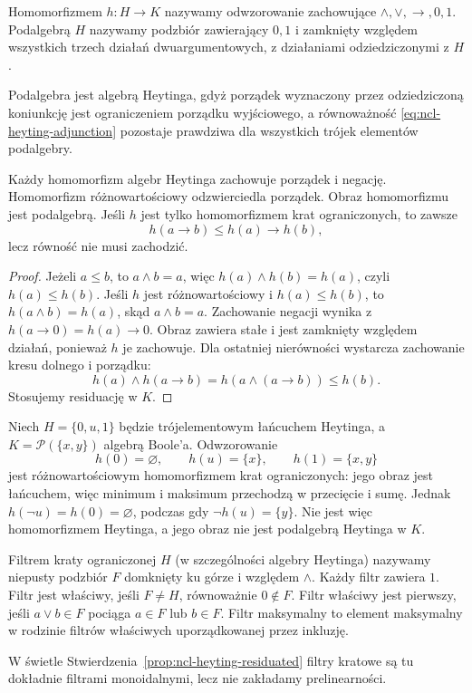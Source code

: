 \begin{definicja}
\label{def:ncl-heyting-homomorphism}
Homomorfizmem $h:H\to K$ nazywamy odwzorowanie
zachowujące $\wedge,\vee,\to,0,1$.
Podalgebrą $H$ nazywamy podzbiór zawierający $0,1$
i zamknięty względem wszystkich trzech działań
dwuargumentowych, z działaniami odziedziczonymi z $H$.
\end{definicja}
Podalgebra jest algebrą Heytinga, gdyż porządek
wyznaczony przez odziedziczoną koniunkcję jest
ograniczeniem porządku wyjściowego, a równoważność
\eqref{eq:ncl-heyting-adjunction} pozostaje prawdziwa
dla wszystkich trójek elementów podalgebry.

\begin{stwierdzenie}
\label{prop:ncl-heyting-hom-order}
Każdy homomorfizm algebr Heytinga zachowuje porządek
i negację. Homomorfizm różnowartościowy odzwierciedla
porządek. Obraz homomorfizmu jest podalgebrą.
Jeśli $h$ jest tylko homomorfizmem krat ograniczonych,
to zawsze
\[
 h(a\to b)\leq h(a)\to h(b),
\]
lecz równość nie musi zachodzić.
\end{stwierdzenie}
\begin{proof}
Jeżeli $a\leq b$, to $a\wedge b=a$,
więc $h(a)\wedge h(b)=h(a)$, czyli $h(a)\leq h(b)$.
Jeśli $h$ jest różnowartościowy i $h(a)\leq h(b)$,
to $h(a\wedge b)=h(a)$, skąd $a\wedge b=a$.
Zachowanie negacji wynika z
$h(a\to0)=h(a)\to0$.
Obraz zawiera stałe i jest zamknięty względem
działań, ponieważ $h$ je zachowuje.
Dla ostatniej nierówności wystarcza zachowanie
kresu dolnego i porządku:
\[
 h(a)\wedge h(a\to b)=h(a\wedge(a\to b))\leq h(b).
\]
Stosujemy residuację w $K$.
\end{proof}

\begin{przyklad}
\label{ex:ncl-heyting-lattice-embedding}
Niech $H=\{0,u,1\}$ będzie trójelementowym
łańcuchem Heytinga, a $K=\mathcal P(\{x,y\})$
algebrą Boole'a. Odwzorowanie
\[
 h(0)=\varnothing,\qquad h(u)=\{x\},\qquad
 h(1)=\{x,y\}
\]
jest różnowartościowym homomorfizmem krat
ograniczonych: jego obraz jest łańcuchem, więc
minimum i maksimum przechodzą w przecięcie i sumę.
Jednak $h(\neg u)=h(0)=\varnothing$,
podczas gdy $\neg h(u)=\{y\}$.
Nie jest więc homomorfizmem Heytinga, a jego obraz
nie jest podalgebrą Heytinga w $K$.
\end{przyklad}

\begin{definicja}
\label{def:ncl-heyting-filter}
Filtrem kraty ograniczonej $H$ (w szczególności
algebry Heytinga) nazywamy niepusty
podzbiór $F$ domknięty ku górze i względem $\wedge$.
Każdy filtr zawiera $1$.
Filtr jest właściwy, jeśli $F\neq H$,
równoważnie $0\notin F$.
Filtr właściwy jest pierwszy, jeśli
$a\vee b\in F$ pociąga $a\in F$ lub $b\in F$.
Filtr maksymalny to element maksymalny w rodzinie
filtrów właściwych uporządkowanej przez inkluzję.
\end{definicja}
W świetle Stwierdzenia~\ref{prop:ncl-heyting-residuated}
filtry kratowe są tu dokładnie filtrami monoidalnymi,
lecz nie zakładamy prelinearności.

